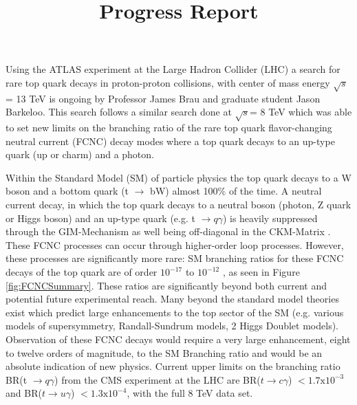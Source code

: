 \documentclass[12pt,letterpaper]{article}
\begin{document}
\title{Progress Report}  \date{\vspace{-10ex}}

\maketitle

\par Using the ATLAS experiment at the Large Hadron Collider (LHC) a search for rare top quark decays in proton-proton collisions,  with center of mass energy $\sqrt{s}$ = 13 TeV is ongoing by Professor James Brau and graduate student Jason Barkeloo.  This search follows a similar search done at $\sqrt{s}$= 8 TeV which was able to set new limits on the branching ratio of the rare top quark flavor-changing neutral current (FCNC) decay modes where a top quark decays to an up-type quark (up or charm) and a photon.

\par Within the Standard Model (SM) of particle physics the top quark decays to a W boson and a bottom quark (t $\rightarrow$ bW) almost 100$\%$ of the time. A neutral current decay, in which the top quark decays to a neutral boson (photon, Z quark or Higgs boson) and an up-type quark (e.g. t $\rightarrow q\gamma$) is heavily suppressed through the GIM-Mechanism \cite{gim} as well being off-diagonal in the CKM-Matrix \cite{ckm}.  These FCNC processes can occur through higher-order loop processes.  However, these processes are significantly more rare: SM branching ratios for these FCNC decays of the top quark are of order $ 10^{-17}$ to $10^{-12}$ \cite{snowmass}, as seen in Figure \ref{fig:FCNCSummary}.  These ratios are significantly beyond both current and potential future experimental reach.  Many beyond the standard model theories exist which predict large enhancements to the top sector of the SM (e.g. various models of supersymmetry, Randall-Sundrum models, 2 Higgs Doublet models).  Observation of these FCNC decays would require a very large enhancement, eight to twelve orders of magnitude, to the SM Branching ratio and would be an absolute indication of new physics.  Current upper limits on the branching ratio BR(t $\rightarrow q\gamma$) from the CMS experiment at the LHC are BR($t \rightarrow c\gamma$) $< 1.7\text{x}10^{-3}$ and BR($t \rightarrow u\gamma$) $< 1.3\text{x} 10^{-4}$, with the full 8 TeV data set\cite{cms}.  
\end{document}
